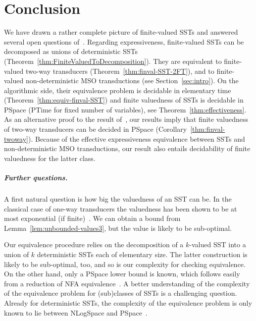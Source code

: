 \documentclass{article}
\begin{document}
\section{Conclusion}\label{sec:conclusion}

We have drawn a rather complete
picture of finite-valued SSTs and answered several open questions of~\cite{DBLP:conf/icalp/AlurD11}. 
Regarding expressiveness, finite-valued SSTs can be decomposed as unions of deterministic SSTs
(Theorem~\ref{thm:FiniteValuedToDecomposition}). They are
equivalent to finite-valued two-way transducers
(Theorem~\ref{thm:finval-SST-2FT}), and to finite-valued
non-deterministic MSO
transductions (see Section~\ref{sec:intro}). On the algorithmic side,
their equivalence problem is decidable in elementary time
(Theorem~\ref{thm:equiv-finval-SST}) and finite valuedness of SSTs is
decidable in {\upshape\sc PSpace} ({\upshape\sc PTime} for fixed number of
variables), see Theorem~\ref{thm:effectiveness}. As an alternative proof
to the result of~\cite{YenY22}, our results imply that finite valuedness of
two-way transducers can be decided in
{\upshape\sc PSpace} 
(Corollary~\ref{thm:finval-twoway}). Because of the effective expressiveness
equivalence between SSTs and non-deterministic MSO transductions, our
result also entails decidability of finite valuedness for the latter
class.


\medskip
\subparagraph{\bf Further questions.}
A first natural question is how big the valuedness of an SST can
be.
In the classical case of one-way transducers the valuedness has been
shown to be at most exponential (if finite)~\cite{Weber93}.
We can obtain a bound from Lemma~\ref{lem:unbounded-values3}, but the
value is likely to be sub-optimal.


Our equivalence procedure relies on the
decomposition of a $k$-valued SST into a union of $k$ deterministic
SSTs each of elementary size. The latter construction is likely to
be sub-optimal, too, and so is our complexity for checking equivalence. 
On the other hand, only a {\upshape\sc PSpace} lower bound is
known, which follows easily from a reduction of NFA equivalence~\cite{AhoHU74}. 
A better understanding of the
complexity of the equivalence problem for (sub)classes of SSTs is a
challenging question. Already for deterministic SSTs, the complexity of the equivalence problem
is only known to lie between {\upshape\sc NLogSpace} and
{\upshape\sc PSpace}~\cite{DBLP:conf/popl/AlurC11}.
\end{document}
